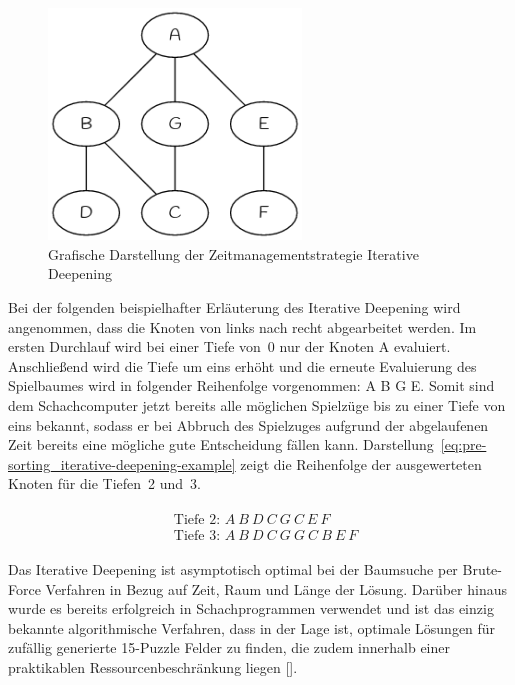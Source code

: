 \begin{figure}[H]
    \centering
    \includegraphics[width=0.6\textwidth]{images/theory/pre-sorting_iterative-deepening.png}
    \caption[Grafische Darstellung der Zeitmanagementstrategie Iterative Deepening]{Grafische Darstellung der Zeitmanagementstrategie Iterative Deepening}
    \label{fig:pre-sorting_iterative-deepening}
\end{figure}

\noindent Bei der folgenden beispielhafter Erläuterung des Iterative Deepening wird angenommen, dass die Knoten von links nach recht abgearbeitet werden.
Im ersten Durchlauf wird bei einer Tiefe von~0 nur der Knoten A evaluiert.
Anschließend wird die Tiefe um eins erhöht und die erneute Evaluierung des Spielbaumes wird in folgender Reihenfolge vorgenommen: A B G E.
Somit sind dem Schachcomputer jetzt bereits alle möglichen Spielzüge bis zu einer Tiefe von eins bekannt, sodass er bei Abbruch des Spielzuges aufgrund der abgelaufenen Zeit bereits eine mögliche gute Entscheidung fällen kann.
Darstellung~\ref{eq:pre-sorting_iterative-deepening-example} zeigt die Reihenfolge der ausgewerteten Knoten für die Tiefen~2 und~3.

\begin{align} \label{eq:pre-sorting_iterative-deepening-example}
\begin{split}
    & \text{Tiefe 2: } A\ B\ D\ C\ G\ C\ E\ F\\
    & \text{Tiefe 3: } A\ B\ D\ C\ G\ G\ C\ B\ E\ F
\end{split}
\end{align}

Das Iterative Deepening ist asymptotisch optimal bei der Baumsuche per Brute-Force Verfahren in Bezug auf Zeit, Raum und Länge der Lösung.
Darüber hinaus wurde es bereits erfolgreich in Schachprogrammen verwendet und ist das einzig bekannte algorithmische Verfahren, dass in der Lage ist, optimale Lösungen für zufällig generierte 15-Puzzle Felder zu finden, die zudem innerhalb einer praktikablen Ressourcenbeschränkung liegen [\cite{Korf1985}].
